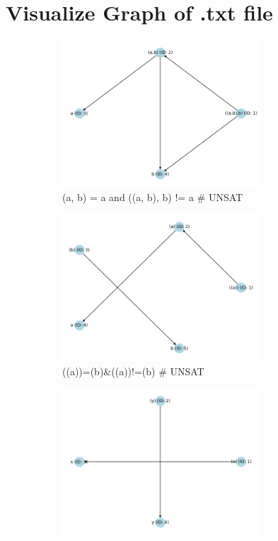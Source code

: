 \documentclass[11pt]{report}
\begin{document}
\newpage
\section*{Visualize Graph of .txt file}

\begin{figure}[h]

    \begin{subfigure}{0.5\textwidth}
        \includegraphics[width=0.9\linewidth, height=5.5cm]{graph/(a, b) = a and ((a, b), b) != a.png} 
        \caption*{(a, b) = a and ((a, b), b) != a \color{red}\# UNSAT }
        \label{fig:subim1}
        \end{subfigure}
    \begin{subfigure}{0.5\textwidth}
        \includegraphics[width=0.9\linewidth, height=5.5cm]{graph/((a))=(b)&((a))!=(b).png} 
        \caption*{((a))=(b)\&((a))!=(b) \color{red}\# UNSAT}
        \label{fig:subim2}
        \end{subfigure}
    \begin{subfigure}{0.5\textwidth}
        \includegraphics[width=0.9\linewidth, height=5.5cm]{graph/(x) = (y) and x != y.png}

\end{subfigure}
\end{figure}
\end{document}
